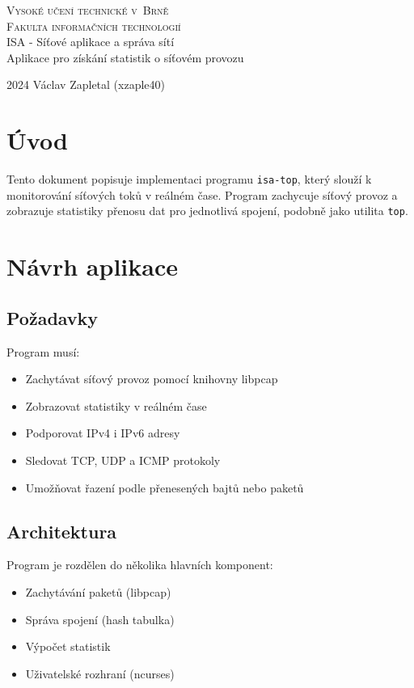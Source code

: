 \documentclass[a4paper,11pt]{article}
\theoremstyle{definition}
\begin{document}
\begin{titlepage}
    \begin{center}
        \Huge
        \textsc{Vysoké učení technické v~Brně\\
        \huge Fakulta informačních technologií}\\
        \LARGE ISA - Síťové aplikace a správa sítí\\
        Aplikace pro získání statistik o síťovém provozu
    \end{center}
    {\Large 2024 \hfill Václav Zapletal (xzaple40)}
\end{titlepage}

\tableofcontents
\newpage

\section{Úvod}
Tento dokument popisuje implementaci programu \texttt{isa-top}, který slouží k monitorování síťových toků v reálném čase. Program zachycuje síťový provoz a zobrazuje statistiky přenosu dat pro jednotlivá spojení, podobně jako utilita \texttt{top}.

\section{Návrh aplikace}
\subsection{Požadavky}
Program musí:
\begin{itemize}
    \item Zachytávat síťový provoz pomocí knihovny libpcap
    \item Zobrazovat statistiky v reálném čase
    \item Podporovat IPv4 i IPv6 adresy
    \item Sledovat TCP, UDP a ICMP protokoly
    \item Umožňovat řazení podle přenesených bajtů nebo paketů
\end{itemize}

\subsection{Architektura}
Program je rozdělen do několika hlavních komponent:
\begin{itemize}
    \item Zachytávání paketů (libpcap)
    \item Správa spojení (hash tabulka)
    \item Výpočet statistik
    \item Uživatelské rozhraní (ncurses)
\end{itemize}
\end{document}
